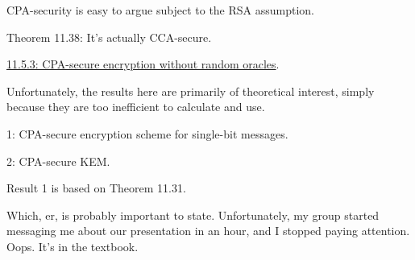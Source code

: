 \documentclass[12pt]{article}
\begin{document}
CPA-security is easy to argue subject to the RSA assumption.

Theorem 11.38: It's actually CCA-secure.

\underline{11.5.3: CPA-secure encryption without random oracles}.

Unfortunately, the results here are primarily of theoretical interest, simply because they are too inefficient to calculate and use.

1: CPA-secure encryption scheme for single-bit messages.

2: CPA-secure KEM.

Result 1 is based on Theorem 11.31.

Which, er, is probably important to state. Unfortunately, my group started messaging me about our presentation in an hour, and I stopped paying attention. Oops. It's in the textbook.
\end{document}
